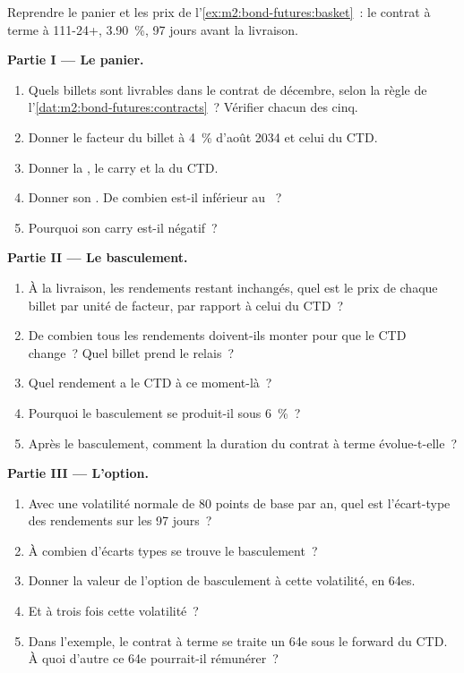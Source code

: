 \begin{problem}\label{pb:m2:bond-futures:1}
Reprendre le panier et les prix de l'\cref{ex:m2:bond-futures:basket}~: le contrat à terme
à 111-24+,  3.90~\%, 97 jours avant la livraison.

\medskip\noindent\textbf{Partie I --- Le panier.}
\begin{enumerate}
\item Quels billets sont livrables dans le contrat de décembre, selon la règle de
l'\cref{dat:m2:bond-futures:contracts}~? Vérifier chacun des cinq.
\item Donner le facteur du billet à 4~\% d'août 2034 et celui du CTD.
\item Donner la , le carry et la  du CTD.
\item Donner son . De combien est-il inférieur au ~?
\item Pourquoi son carry est-il négatif~?
\end{enumerate}

\medskip\noindent\textbf{Partie II --- Le basculement.}
\begin{enumerate}[resume]
\item À la livraison, les rendements restant inchangés, quel est le prix de chaque billet par
unité de facteur, par rapport à celui du CTD~?
\item De combien tous les rendements doivent-ils monter pour que le CTD change~? Quel billet prend
le relais~?
\item Quel rendement a le CTD à ce moment-là~?
\item Pourquoi le basculement se produit-il sous 6~\%~?
\item Après le basculement, comment la duration du contrat à terme évolue-t-elle~?
\end{enumerate}

\medskip\noindent\textbf{Partie III --- L'option.}
\begin{enumerate}[resume]
\item Avec une volatilité normale de 80 points de base par an, quel est l'écart-type
des rendements sur les 97 jours~?
\item À combien d'écarts types se trouve le basculement~?
\item Donner la valeur de l'option de basculement à cette volatilité, en 64es.
\item Et à trois fois cette volatilité~?
\item Dans l'exemple, le contrat à terme se traite un 64e sous le forward du CTD. À quoi
d'autre ce 64e pourrait-il rémunérer~?
\end{enumerate}


\end{problem}
